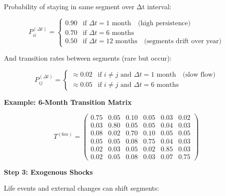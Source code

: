 \begin{definition}
Probability of staying in same segment over Δt interval:

\begin{equation}
P_{ii}^{(\Delta t)} = \begin{cases}
0.90 & \text{if } \Delta t = 1\text{ month} \quad \text{(high persistence)} \\
0.70 & \text{if } \Delta t = 6\text{ months} \\
0.50 & \text{if } \Delta t = 12\text{ months} \quad \text{(segments drift over year)}
\end{cases}
\label{eq:19-persistence}
\end{equation}

And transition rates between segments (rare but occur):

\begin{equation}
P_{ij}^{(\Delta t)} = \begin{cases}
\approx 0.02 & \text{if } i \neq j \text{ and } \Delta t = 1\text{ month} \quad \text{(slow flow)} \\
\approx 0.05 & \text{if } i \neq j \text{ and } \Delta t = 6\text{ months}
\end{cases}
\end{equation}

\end{definition}

\textbf{Example: 6-Month Transition Matrix}

\begin{equation}
T^{(6m)} = \begin{pmatrix}
0.75 & 0.05 & 0.10 & 0.05 & 0.03 & 0.02 \\
0.03 & 0.80 & 0.05 & 0.05 & 0.04 & 0.03 \\
0.08 & 0.02 & 0.70 & 0.10 & 0.05 & 0.05 \\
0.05 & 0.05 & 0.08 & 0.75 & 0.04 & 0.03 \\
0.02 & 0.03 & 0.05 & 0.02 & 0.85 & 0.03 \\
0.02 & 0.05 & 0.08 & 0.03 & 0.07 & 0.75
\end{pmatrix}
\end{equation}

\textbf{Step 3: Exogenous Shocks}

Life events and external changes can shift segments:

